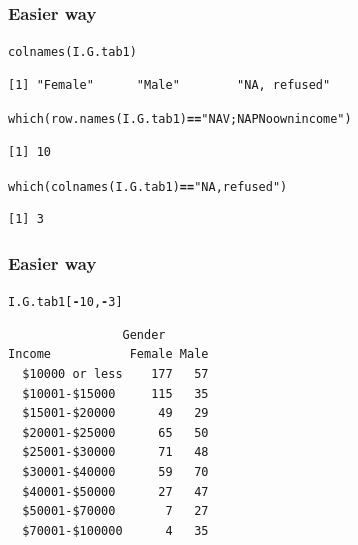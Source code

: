 \documentclass{beamer}\usepackage[]{graphicx}\usepackage[]{color}
\makeatletter
\newcommand{\hlnum}[1]{\textcolor[rgb]{0.533,0,0.133}{#1}}%
\newcommand{\hlstr}[1]{\textcolor[rgb]{0.667,0.267,0}{#1}}%
\newcommand{\hlopt}[1]{\textcolor[rgb]{0,0,0}{\textbf{#1}}}%
\newcommand{\hlstd}[1]{\textcolor[rgb]{0,0,0}{#1}}%
\newcommand{\hlkwd}[1]{\textcolor[rgb]{0,0.267,0.4}{#1}}%
\newenvironment{kframe}{%
 \def\at@end@of@kframe{}%
 \ifinner\ifhmode%
  \def\at@end@of@kframe{\end{minipage}}%
  \begin{minipage}{\columnwidth}%
 \fi\fi%
 \def\FrameCommand##1{\hskip\@totalleftmargin \hskip-\fboxsep
 \colorbox{shadecolor}{##1}\hskip-\fboxsep
     \hskip-\linewidth \hskip-\@totalleftmargin \hskip\columnwidth}%
 \MakeFramed {\advance\hsize-\width
   \@totalleftmargin\z@ \linewidth\hsize
   \@setminipage}}%
 {\par\unskip\endMakeFramed%
 \at@end@of@kframe}
\newenvironment{knitrout}{}{} %
\makeatother
\begin{document}
\begin{frame}[fragile]
\frametitle{Easier way} 
\begin{knitrout}
\color{fgcolor}\begin{kframe}
\begin{alltt}
\hlkwd{colnames}\hlstd{(I.G.tab1)}
\end{alltt}
\begin{verbatim}
[1] "Female"      "Male"        "NA, refused"
\end{verbatim}
\begin{alltt}
\hlkwd{which}\hlstd{(}\hlkwd{row.names}\hlstd{(I.G.tab1)} \hlopt{==} \hlstr{"NAV; NAP No own income"}\hlstd{)}
\end{alltt}
\begin{verbatim}
[1] 10
\end{verbatim}
\begin{alltt}
\hlkwd{which}\hlstd{(}\hlkwd{colnames}\hlstd{(I.G.tab1)} \hlopt{==} \hlstr{"NA, refused"}\hlstd{)}
\end{alltt}
\begin{verbatim}
[1] 3
\end{verbatim}
\end{kframe}
\end{knitrout}
\end{frame}
\begin{frame}[fragile]
\frametitle{Easier way} 
\begin{knitrout}
\color{fgcolor}\begin{kframe}
\begin{alltt}
\hlstd{I.G.tab1[}\hlopt{-}\hlnum{10}\hlstd{,} \hlopt{-}\hlnum{3}\hlstd{]}
\end{alltt}
\begin{verbatim}
                Gender
Income           Female Male
  $10000 or less    177   57
  $10001-$15000     115   35
  $15001-$20000      49   29
  $20001-$25000      65   50
  $25001-$30000      71   48
  $30001-$40000      59   70
  $40001-$50000      27   47
  $50001-$70000       7   27
  $70001-$100000      4   35
\end{verbatim}
\end{kframe}
\end{knitrout}
\end{frame}
\end{document}
